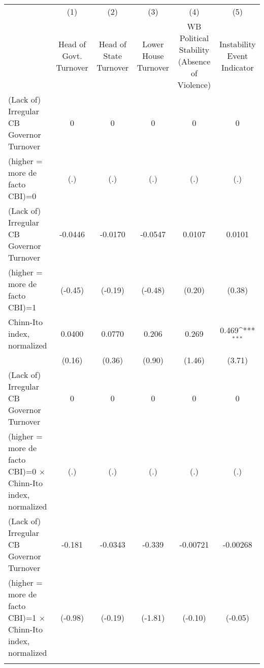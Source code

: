 {
\def\sym#1{\ifmmode^{#1}\else\(^{#1}\)\fi}
\begin{tabular}{l*{5}{c}}
\toprule
                                        &\multicolumn{1}{c}{(1)}&\multicolumn{1}{c}{(2)}&\multicolumn{1}{c}{(3)}&\multicolumn{1}{c}{(4)}&\multicolumn{1}{c}{(5)}\\
                                        &\multicolumn{1}{c}{Head of Govt. Turnover}&\multicolumn{1}{c}{Head of State Turnover}&\multicolumn{1}{c}{Lower House Turnover}&\multicolumn{1}{c}{WB Political Stability (Absence of Violence)}&\multicolumn{1}{c}{Instability Event Indicator}\\
\midrule
(Lack of) Irregular CB Governor Turnover&         0         &         0         &         0         &         0         &         0         \\
(higher = more de facto CBI)=0          &       (.)         &       (.)         &       (.)         &       (.)         &       (.)         \\
\addlinespace
(Lack of) Irregular CB Governor Turnover&   -0.0446         &   -0.0170         &   -0.0547         &    0.0107         &    0.0101         \\
(higher = more de facto CBI)=1          &   (-0.45)         &   (-0.19)         &   (-0.48)         &    (0.20)         &    (0.38)         \\
\addlinespace
Chinn-Ito index, normalized             &    0.0400         &    0.0770         &     0.206         &     0.269         &     0.469\sym{***}\\
                                        &    (0.16)         &    (0.36)         &    (0.90)         &    (1.46)         &    (3.71)         \\
\addlinespace
(Lack of) Irregular CB Governor Turnover&         0         &         0         &         0         &         0         &         0         \\
(higher = more de facto CBI)=0 $\times$ Chinn-Ito index, normalized&       (.)         &       (.)         &       (.)         &       (.)         &       (.)         \\
\addlinespace
(Lack of) Irregular CB Governor Turnover&    -0.181         &   -0.0343         &    -0.339         &  -0.00721         &  -0.00268         \\
(higher = more de facto CBI)=1 $\times$ Chinn-Ito index, normalized&   (-0.98)         &   (-0.19)         &   (-1.81)         &   (-0.10)         &   (-0.05)         \\
\addlinespace

\end{tabular}}

